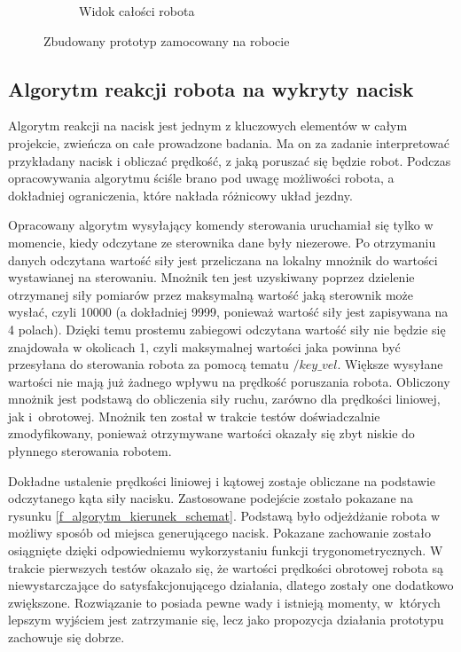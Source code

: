 \begin{figure}
\begin{subfigure}[t]{0.35\linewidth}
    \caption{Widok całości robota} 
  \end{subfigure}
  \centering
  \caption{Zbudowany prototyp zamocowany na robocie}
  \label{f_czujnik_na_robocie}
\end{figure}

\subsection{Algorytm reakcji robota na wykryty nacisk}
\label{ss_integracja_algorytm}

Algorytm reakcji na nacisk jest jednym z kluczowych elementów w całym projekcie, zwieńcza on całe prowadzone badania. Ma on za zadanie interpretować przykładany nacisk i obliczać prędkość, z jaką poruszać się będzie robot. Podczas opracowywania algorytmu ściśle brano pod uwagę możliwości robota, a dokładniej ograniczenia, które nakłada różnicowy układ jezdny.

Opracowany algorytm wysyłający komendy sterowania uruchamiał się tylko w momencie, kiedy odczytane ze sterownika dane były niezerowe. Po otrzymaniu danych odczytana wartość siły jest przeliczana na lokalny mnożnik do wartości wystawianej na sterowaniu. Mnożnik ten jest uzyskiwany poprzez dzielenie otrzymanej siły pomiarów przez maksymalną wartość jaką sterownik może wysłać, czyli 10000 (a dokładniej 9999, ponieważ wartość siły jest zapisywana na 4 polach). %
Dzięki temu prostemu zabiegowi odczytana wartość siły nie będzie się znajdowała w okolicach 1, czyli maksymalnej wartości jaka powinna być przesyłana do sterowania robota za pomocą tematu $/key\_vel$. Większe wysyłane wartości nie mają już żadnego wpływu na prędkość poruszania robota. Obliczony mnożnik jest podstawą do obliczenia siły ruchu, zarówno dla prędkości liniowej, jak i~obrotowej. Mnożnik ten został w trakcie testów doświadczalnie zmodyfikowany, ponieważ otrzymywane wartości okazały się zbyt niskie do płynnego sterowania robotem.

Dokładne ustalenie prędkości liniowej i kątowej zostaje obliczane na podstawie odczytanego kąta siły nacisku. Zastosowane podejście zostało pokazane na rysunku \ref{f_algorytm_kierunek_schemat}. Podstawą było odjeżdżanie robota w możliwy sposób od miejsca generującego nacisk.
Pokazane zachowanie zostało osiągnięte dzięki odpowiedniemu wykorzystaniu funkcji trygonometrycznych. W trakcie pierwszych testów okazało się, że wartości prędkości obrotowej robota są niewystarczające do satysfakcjonującego działania, dlatego zostały one dodatkowo zwiększone. Rozwiązanie to posiada pewne wady i istnieją momenty, w~których lepszym wyjściem jest zatrzymanie się, lecz jako propozycja działania prototypu zachowuje się dobrze.

